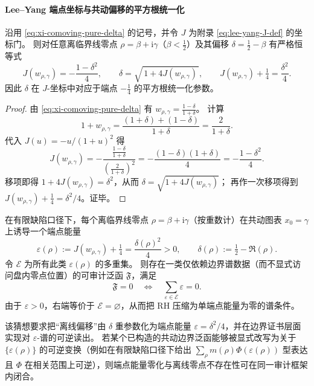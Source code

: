 \paragraph{Lee--Yang 端点坐标与共动偏移的平方根统一化}
\begin{theorem}\label{thm:xi-comoving-leyang-endpoint-square-root}
沿用 \eqref{eq:xi-comoving-pure-delta} 的记号，并令 \(J\) 为附录 \eqref{eq:lee-yang-J-def} 的坐标门。
则对任意离临界线零点 \(\rho=\beta+\mathrm{i}\gamma\)（\(\beta<\tfrac12\)）及其偏移 \(\delta=\tfrac12-\beta\) 有严格恒等式
\[
J(w_{\rho,\gamma})=-\frac{1-\delta^2}{4},
\qquad
\delta=\sqrt{\,1+4J(w_{\rho,\gamma})\,},
\qquad
J(w_{\rho,\gamma})+\tfrac14=\frac{\delta^2}{4}.
\]
因此 \(\delta\) 在 \(J\)-坐标中对应于端点 \(-\tfrac14\) 的平方根统一化参数。
\end{theorem}
\begin{proof}
由 \eqref{eq:xi-comoving-pure-delta} 有 \(w_{\rho,\gamma}=\frac{1-\delta}{1+\delta}\)。
计算
\[
1+w_{\rho,\gamma}=\frac{(1+\delta)+(1-\delta)}{1+\delta}=\frac{2}{1+\delta}.
\]
代入 \(J(u)=-u/(1+u)^2\) 得
\[
J(w_{\rho,\gamma})
=-\frac{\frac{1-\delta}{1+\delta}}{\left(\frac{2}{1+\delta}\right)^2}
=-\frac{(1-\delta)(1+\delta)}{4}
=-\frac{1-\delta^2}{4}.
\]
移项即得 \(1+4J(w_{\rho,\gamma})=\delta^2\)，从而 \(\delta=\sqrt{1+4J(w_{\rho,\gamma})}\)；
再作一次移项得到 \(J(w_{\rho,\gamma})+\tfrac14=\delta^2/4\)。证毕。
\end{proof}

\begin{conjecture}\label{conj:xi-leyang-endpoint-square-root-rigidity}
在有限缺陷口径下，每个离临界线零点 \(\rho=\beta+\mathrm{i}\gamma\)（按重数计）在共动图表 \(x_0=\gamma\) 上诱导一个端点能量
\[
\varepsilon(\rho):=J(w_{\rho,\gamma})+\tfrac14=\frac{\delta(\rho)^2}{4}>0,
\qquad \delta(\rho):=\tfrac12-\Re(\rho).
\]
令 \(\mathscr E\) 为所有此类 \(\varepsilon(\rho)\) 的多重集。
则存在一类仅依赖边界谱数据（而不显式访问盘内零点位置）的可审计泛函 \(\mathfrak F\)，满足
\[
\mathfrak F=0 \quad\Longleftrightarrow\quad \sum_{\varepsilon\in\mathscr E}\varepsilon=0.
\]
由于 \(\varepsilon>0\)，右端等价于 \(\mathscr E=\varnothing\)，从而把 RH 压缩为单端点能量为零的谱条件。
\end{conjecture}

\begin{remark}\label{rem:xi-leyang-endpoint-square-root-rigidity-route}
该猜想要求把“离线偏移”由 \(\delta\) 重参数化为端点能量 \(\varepsilon=\delta^2/4\)，并在边界证书层面实现对 \(\varepsilon\)-谱的可逆读出。
若某个已构造的共动边界泛函能够被显式改写为关于 \(\{\varepsilon(\rho)\}\) 的可逆变换（例如在有限缺陷口径下给出 \(\sum_{\rho}m(\rho)\Phi(\varepsilon(\rho))\) 型表达且 \(\Phi\) 在相关范围上可逆），则端点能量零化与离线零点不存在性可在同一审计框架内闭合。
\end{remark}

\endinput
